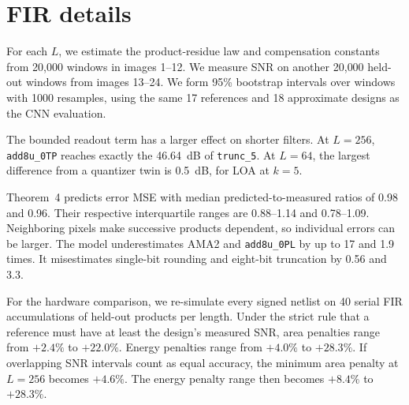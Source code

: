 \documentclass[11pt]{article}
\begin{document}
\section{FIR details}

For each $L$, we estimate the product-residue law and compensation
constants from 20{,}000 windows in images 1--12. We measure SNR on another
20{,}000 held-out windows from images 13--24. We form 95\%
bootstrap intervals over windows with 1000 resamples, using the same
17 references and 18 approximate designs as the CNN evaluation.

The bounded readout term has a larger effect on shorter filters. At
$L=256$, \texttt{add8u\_0TP} reaches exactly the 46.64~dB of
\texttt{trunc\_5}. At $L=64$, the largest difference from a quantizer twin
is 0.5~dB, for LOA at $k=5$.

Theorem~4 predicts error MSE with median predicted-to-measured ratios
of 0.98 and 0.96. Their respective interquartile ranges are
0.88--1.14 and 0.78--1.09. Neighboring pixels make successive
products dependent, so individual errors can be larger. The model
underestimates AMA2 and \texttt{add8u\_0PL} by up to 17 and 1.9
times. It misestimates single-bit rounding and eight-bit truncation
by 0.56 and 3.3.

For the hardware comparison, we re-simulate every signed netlist on
40 serial FIR accumulations of held-out products per length.
Under the strict rule that a reference must have at least the design's
measured SNR, area penalties range from $+2.4\%$ to $+22.0\%$.
Energy penalties range from $+4.0\%$ to $+28.3\%$.
If overlapping SNR intervals count as equal
accuracy, the minimum area penalty at $L=256$ becomes $+4.6\%$. The energy
penalty range then becomes $+8.4\%$ to $+28.3\%$.
\end{document}

